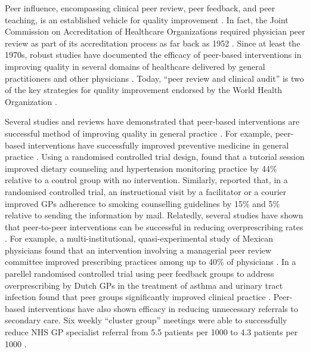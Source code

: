 \documentclass[12pt]{article}
\begin{document}
Peer influence, encompassing clinical peer review, peer feedback, and peer teaching, is an established vehicle for quality improvement \citep{sargeantFacilitatedReflectivePerformance2015}. In fact, the Joint Commission on Accreditation of Healthcare Organizations required physician peer review as part of its accreditation process as far back as 1952 \citep{goldbergPeerReviewPrivilege1984}. Since at least the 1970s, robust studies have documented the efficacy of peer-based interventions in improving quality in several domains of healthcare delivered by general practitioners and other physicians \citep{mittmanImplementingClinicalPractice1992,jamtvedtAuditFeedbackEffects2003}. Today, ``peer review and clinical audit'' is two of the key strategies for quality improvement endorsed by the World Health Organization \citep{worldhealthorganizationDeliveringQualityHealth2018}.

Several studies and reviews have demonstrated that peer-based interventions are successful method of improving quality in general practice \citep{wensingImplementingGuidelinesInnovations1998}. For example, peer-based interventions have successfully improved preventive medicine in general practice \citep{hulscherInterventionsImproveDelivery1999}. Using a randomised controlled trial design, \citet{inuiImprovedOutcomesHypertension1976} found that a tutorial session improved dietary counseling and hypertension monitoring practice by 44\% relative to a control group with no intervention. Similarly, \citet{cockburnRandomisedTrialThree1992} reported that, in a randomised controlled trial, an instructional visit by a facilitator or a courier improved GPs adherence to smoking counselling guidelines by 15\% and 5\% relative to sending the information by mail. Relatedly, several studies have shown that peer-to-peer interventions can be successful in reducing overprescribing rates \citep{arnoldInterventionsImproveAntibiotic2006,avornImprovingDrugTherapyDecisions1983}. For example, a multi-institutional, quasi-experimental study of Mexican physicians found that an intervention involving a managerial peer review committee improved prescribing practices among up to 40\% of physicians \citep{perez-cuevasImprovingPhysicianPrescribing1996}. In a parellel randomised controlled trial using peer feedback groups to address overprescribing by Dutch GPs in the treatment of asthma and urinary tract infection found that peer groups significantly improved clinical practice \citep{veningaImprovingDrugTreatment2000}. Peer-based interventions have also shown efficacy in reducing unnecessary referrals to secondary care. Six weekly ``cluster group'' meetings were able to successfully reduce NHS GP specialist referral from 5.5 patients per 1000 to 4.3 patients per 1000 \citep{evansReducingVariationGeneral2011}.
\end{document}
